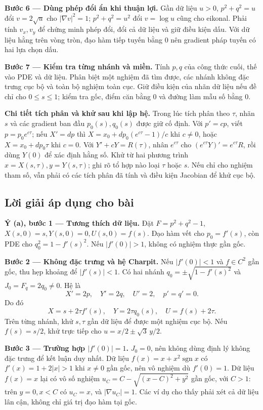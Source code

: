 \documentclass[10pt,a4paper]{article}
\begin{document}
\textbf{Bước 6 — Dùng phép đổi ẩn khi thuận lợi.} Gần dữ liệu $u>0$, $p^2+q^2=u$ đổi $v=2\sqrt u$ cho $|\nabla v|^2=1$; $p^2+q^2=u^2$ đổi $v=\log u$ cũng cho eikonal. Phải tính $v_x,v_y$ để chứng minh phép đổi, đổi cả dữ liệu và giữ điều kiện dấu. Với dữ liệu hằng trên vòng tròn, đạo hàm tiếp tuyến bằng 0 nên gradient pháp tuyến có hai lựa chọn dấu.

\textbf{Bước 7 — Kiểm tra từng nhánh và miền.} Tính $p,q$ của công thức cuối, thế vào PDE và dữ liệu. Phân biệt một nghiệm đã tìm được, các nhánh không đặc trưng cục bộ và toàn bộ nghiệm toàn cục. Giữ điều kiện của nhãn dữ liệu nếu đề chỉ cho $0\le s\le1$; kiểm tra gốc, điểm căn bằng 0 và đường làm mẫu số bằng 0.

\textbf{Chi tiết tích phân và khử sau khi lập hệ.} Trong lúc tích phân theo $\tau$, nhãn $s$ và các gradient ban đầu $p_0(s),q_0(s)$ được giữ cố định. Với $p'=cp$, viết $p=p_0e^{c\tau}$; nếu $X'=dp$ thì $X=x_0+dp_0(e^{c\tau}-1)/c$ khi $c\ne0$, hoặc $X=x_0+dp_0\tau$ khi $c=0$. Với $Y'+cY=R(\tau)$, nhân $e^{c\tau}$ cho $(e^{c\tau}Y)'=e^{c\tau}R$, rồi dùng $Y(0)$ để xác định hằng số. Khử từ hai phương trình $x=X(s,\tau),y=Y(s,\tau)$; ghi rõ tổ hợp nào loại $\tau$ hoặc $s$. Nếu chỉ cho nghiệm tham số, vẫn phải có các tích phân đã tính và điều kiện Jacobian để khử cục bộ.
\subsection*{Lời giải áp dụng cho bài}
\textbf{Ý (a), bước 1 — Tương thích dữ liệu.} Đặt $F=p^2+q^2-1$, $X(s,0)=s,Y(s,0)=0,U(s,0)=f(s)$. Đạo hàm vết cho $p_0=f'(s)$, còn PDE cho $q_0^2=1-f'(s)^2$. Nếu $|f'(0)|>1$, không có nghiệm thực gần gốc.

\textbf{Bước 2 — Không đặc trưng và hệ Charpit.} Nếu $|f'(0)|<1$ và $f\in C^2$ gần gốc, thu hẹp khoảng để $|f'(s)|<1$. Có hai nhánh $q_0=\pm\sqrt{1-f'(s)^2}$ và $J_0=F_q=2q_0\ne0$. Hệ là
\[X'=2p,\quad Y'=2q,\quad U'=2,\quad p'=q'=0.\]
Do đó
\[X=s+2\tau f'(s),\quad Y=2\tau q_0(s),\quad U=f(s)+2\tau.\]
Trên từng nhánh, khử $s,\tau$ gần dữ liệu để được một nghiệm cục bộ. Nếu $f(s)=s/2$, khử trực tiếp cho $u=x/2\pm\sqrt3\,y/2$.

\textbf{Bước 3 — Trường hợp $|f'(0)|=1$.} $J_0=0$, nên không dùng định lý không đặc trưng để kết luận duy nhất. Dữ liệu $f(x)=x+x^2\operatorname{sgn}x$ có $f'(x)=1+2|x|>1$ khi $x\ne0$ gần gốc, nên vô nghiệm dù $f'(0)=1$. Dữ liệu $f(x)=x$ lại có vô số nghiệm $u_C=C-\sqrt{(x-C)^2+y^2}$ gần gốc, với $C>1$: trên $y=0,x<C$ có $u_C=x$, và $|\nabla u_C|=1$. Các ví dụ cho thấy phải xét cả dữ liệu lân cận, không chỉ giá trị đạo hàm tại gốc.
\end{document}
